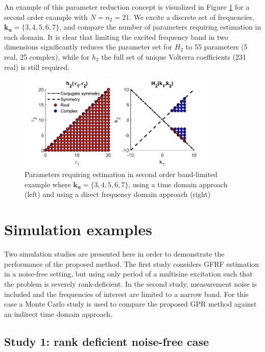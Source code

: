 An example of this parameter reduction concept is visualized in Figure \ref{fig:BandLimitedVisual} for a second order example with $N=n_2=21$. We excite a discrete set of frequencies, $\mathbf{k_u} = \{ 3,4,5,6,7 \}$, and compare the number of parameters requiring estimation in each domain. It is clear that limiting the excited frequency band in two dimensions significantly reduces the parameter set for $H_2$ to 55 parameters (5 real, 25 complex), while for $h_2$ the full set of unique Volterra coefficients (231 real) is still required.

\begin{figure}[h]
\centering
\includegraphics[width = 0.85\textwidth]{Chapter8_GFRFs/LimitedBandParams_paper.pdf}
\caption{Parameters requiring estimation in second order band-limited example where $\mathbf{k_u} = \{ 3,4,5,6,7 \}$, using a time domain approach (left) and using a direct frequency domain approach (right)}
\label{fig:BandLimitedVisual}
\end{figure}

\section{Simulation examples}

Two simulation studies are presented here in order to demonstrate the performance of the proposed method. The first study considers GFRF estimation in a noise-free setting, but using only period of a multisine excitation such that the problem is severely rank-deficient. In the second study, measurement noise is included and the frequencies of interest are limited to a narrow band. For this case a Monte Carlo study is used to compare the proposed GPR method against an indirect time domain approach. 

\subsection{Study 1: rank deficient noise-free case}
\label{sec:GFRF_noisefree_ex}

